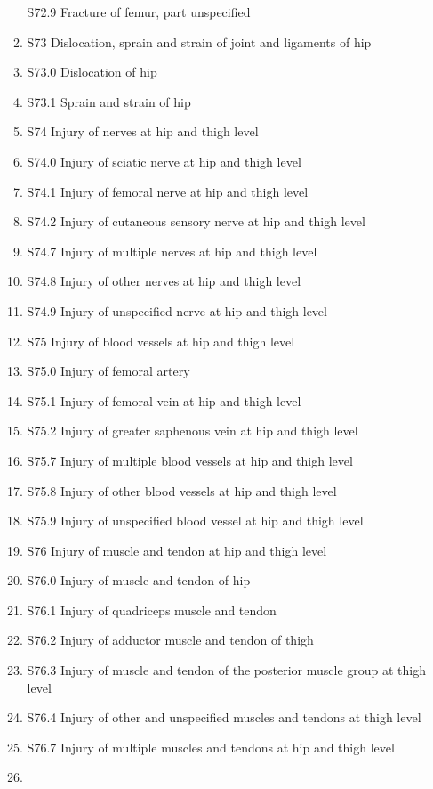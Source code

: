 \documentclass[
]{scrartcl}
\begin{document}
\begin{itemize}
\begin{enumerate}
    S72.9 Fracture of femur, part unspecified
  \item
    S73 Dislocation, sprain and strain of joint and ligaments of hip
  \item
    S73.0 Dislocation of hip
  \item
    S73.1 Sprain and strain of hip
  \item
    S74 Injury of nerves at hip and thigh level
  \item
    S74.0 Injury of sciatic nerve at hip and thigh level
  \item
    S74.1 Injury of femoral nerve at hip and thigh level
  \item
    S74.2 Injury of cutaneous sensory nerve at hip and thigh level
  \item
    S74.7 Injury of multiple nerves at hip and thigh level
  \item
    S74.8 Injury of other nerves at hip and thigh level
  \item
    S74.9 Injury of unspecified nerve at hip and thigh level
  \item
    S75 Injury of blood vessels at hip and thigh level
  \item
    S75.0 Injury of femoral artery
  \item
    S75.1 Injury of femoral vein at hip and thigh level
  \item
    S75.2 Injury of greater saphenous vein at hip and thigh level
  \item
    S75.7 Injury of multiple blood vessels at hip and thigh level
  \item
    S75.8 Injury of other blood vessels at hip and thigh level
  \item
    S75.9 Injury of unspecified blood vessel at hip and thigh level
  \item
    S76 Injury of muscle and tendon at hip and thigh level
  \item
    S76.0 Injury of muscle and tendon of hip
  \item
    S76.1 Injury of quadriceps muscle and tendon
  \item
    S76.2 Injury of adductor muscle and tendon of thigh
  \item
    S76.3 Injury of muscle and tendon of the posterior muscle group at
    thigh level
  \item
    S76.4 Injury of other and unspecified muscles and tendons at thigh
    level
  \item
    S76.7 Injury of multiple muscles and tendons at hip and thigh level
  \item

\end{enumerate}
\end{itemize}
\end{document}
